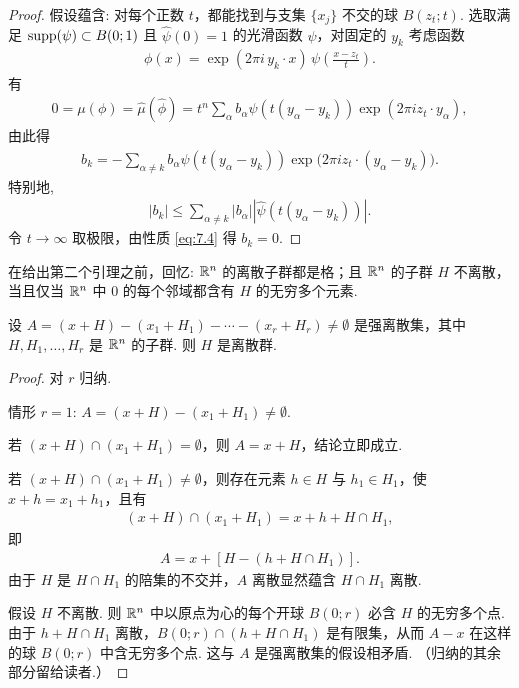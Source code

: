 \begin{proof}
假设蕴含: 对每个正数 $t$，都能找到与支集 $\{x_j\}$ 不交的球 $B(z_t;t)$. 选取满足 $\operatorname{supp}(\psi) \subset B(0;1)$ 且 $\widehat{\psi}(0) = 1$ 的光滑函数 $\psi$，对固定的 $y_k$ 考虑函数
\begin{align*}
  \phi(x)=\exp(2\pi i\,y_{k}\cdot x)\,\psi\left(\frac{x-z_{t}}{t}\right).
\end{align*}
有
\begin{align*}
  0=\mu(\phi)=\widehat{\mu}(\widehat{\phi})
  =t^{n}\sum_{\alpha}b_{\alpha}\widehat{\psi}(t(y_{\alpha}-y_{k}))\exp(2\pi i z_{t}\cdot y_{\alpha}),
\end{align*}
由此得
\begin{align*}
  b_{k}=-\sum_{\alpha\neq k}b_{\alpha}\widehat{\psi}(t(y_{\alpha}-y_{k}))\exp\bigl(2\pi i z_{t}\cdot(y_{\alpha}-y_{k})\bigr).
\end{align*}
特别地,
\begin{align*}
  |b_{k}|\leq\sum_{\alpha\neq k}|b_{\alpha}|\left|\widehat{\psi}(t(y_{\alpha}-y_{k}))\right|.
\end{align*}
令 $t \to \infty$ 取极限，由性质 \eqref{eq:7.4} 得 $b_k = 0$.
\end{proof}

在给出第二个引理之前，回忆: $\mathbb{R}^n$ 的离散子群都是格；且 $\mathbb{R}^n$ 的子群 $H$ 不离散，当且仅当 $\mathbb{R}^n$ 中 $0$ 的每个邻域都含有 $H$ 的无穷多个元素.

\begin{lemma}\label{lem:7.4}
设 $A = (x + H) - (x_1 + H_1) - \cdots - (x_r + H_r) \neq \emptyset$ 是强离散集，其中 $H, H_1, \ldots, H_r$ 是 $\mathbb{R}^n$ 的子群. 则 $H$ 是离散群.
\end{lemma}

\begin{proof}
对 $r$ 归纳.

情形 $r=1$: $A=(x+H)-(x_{1}+H_{1})\neq\emptyset$.

若 $(x + H) \cap (x_1 + H_1) = \emptyset$，则 $A = x + H$，结论立即成立.

若 $(x + H) \cap (x_1 + H_1) \neq \emptyset$，则存在元素 $h \in H$ 与 $h_1 \in H_1$，使 $x + h = x_1 + h_1$，且有
\begin{align*}
  (x+H)\cap(x_{1}+H_{1})=x+h+H\cap H_{1},
\end{align*}
即
\begin{align*}
  A=x+\left[H-\left(h+H\cap H_{1}\right)\right].
\end{align*}
由于 $H$ 是 $H \cap H_1$ 的陪集的不交并，$A$ 离散显然蕴含 $H \cap H_1$ 离散.

假设 $H$ 不离散. 则 $\mathbb{R}^n$ 中以原点为心的每个开球 $B(0; r)$ 必含 $H$ 的无穷多个点. 由于 $h + H \cap H_1$ 离散，$B(0; r) \cap (h + H \cap H_1)$ 是有限集，从而 $A - x$ 在这样的球 $B(0; r)$ 中含无穷多个点. 这与 $A$ 是强离散集的假设相矛盾. （归纳的其余部分留给读者.）
\end{proof}

